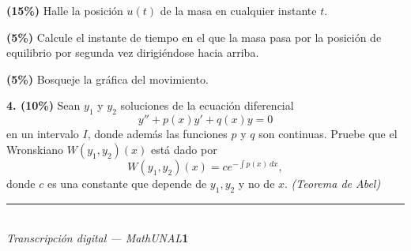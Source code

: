 \documentclass[11pt]{article}
\begin{document}
\begin{opciones}
\item[a.] \textbf{(15\%)} Halle la posición $u(t)$ de la masa en cualquier instante $t$.
\item[b.] \textbf{(5\%)} Calcule el instante de tiempo en el que la masa pasa por la posición de equilibrio por segunda vez dirigiéndose hacia arriba.
\item[c.] \textbf{(5\%)} Bosqueje la gráfica del movimiento.
\end{opciones}

\vspace{6cm}

\newpage

\noindent\textbf{4. (10\%)} Sean $y_1$ y $y_2$ soluciones de la ecuación diferencial
\[
y''+p(x)y'+q(x)y=0
\]
en un intervalo $I$, donde además las funciones $p$ y $q$ son continuas. Pruebe que el Wronskiano $W(y_1,y_2)(x)$ está dado por
\[
W(y_1,y_2)(x)=ce^{-\int p(x)\,dx},
\]
donde $c$ es una constante que depende de $y_1,y_2$ y no de $x$. \textit{(Teorema de Abel)}

\vspace{8cm}

\vfill
\rule{\linewidth}{0.4pt}\\[1pt]
{\scriptsize\textit{Transcripción digital --- MathUNAL}\hfill\textcolor{unalblue}{\textbf{1}}}
\end{document}
